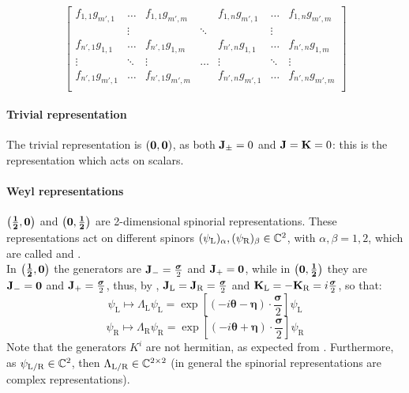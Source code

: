 {\begin{equation*}
\begin{bmatrix}
    f_{1,1} g_{m',1} & \dots & f_{1,1} g_{m',m} &  & f_{1,n} g_{m',1} & \dots & f_{1,n} g_{m',m} \\
     & \vdots &  & \ddots &  & \vdots &  \\
    f_{n',1} g_{1,1} & \dots & f_{n',1} g_{1,m} &  & f_{n',n} g_{1,1} & \dots & f_{n',n} g_{1,m} \\
    \vdots & \ddots & \vdots & \dots & \vdots & \ddots & \vdots \\
    f_{n',1} g_{m',1} & \dots & f_{n',1} g_{m',m} &  & f_{n',n} g_{m',1} & \dots & f_{n',n} g_{m',m} \\
  \end{bmatrix}
\end{equation*}}

\paragraph{Trivial representation}

The trivial representation is $ \mathbf{\left( 0,0 \right)} $, as both $ \mathbf{J}_{\pm} = 0 $ and $ \mathbf{J} = \mathbf{K} = 0 $: this is the representation which acts on scalars.

\paragraph{Weyl representations}

$ \mathbf{\left( \frac{1}{2},0 \right)} $ and $ \mathbf{\left( 0,\frac{1}{2} \right)} $ are 2-dimensional spinorial representations. These representations act on different spinors $ (\psi_\text{L})_\alpha , (\psi_\text{R})_\beta \in \mathbb{C}^2 $, with $ \alpha,\beta = 1,2 $, which are called  and .\\
In $ \mathbf{\left( \frac{1}{2},0 \right)} $ the generators are $ \mathbf{J}_- = \frac{\boldsymbol{\sigma}}{2} $ and $ \mathbf{J}_+ = \mathbf{0} $, while in $ \mathbf{\left( 0,\frac{1}{2} \right)} $ they are $ \mathbf{J}_- = \mathbf{0} $ and $ \mathbf{J}_+ = \frac{\boldsymbol{\sigma}}{2} $, thus, by , $ \mathbf{J}_\text{L} = \mathbf{J}_\text{R} = \frac{\boldsymbol{\sigma}}{2} $ and $ \mathbf{K}_\text{L} = - \mathbf{K}_\text{R} = i \frac{\boldsymbol{\sigma}}{2} $, so that:
\begin{equation}
  \psi_\text{L} \mapsto \Lambda_\text{L} \psi_\text{L} = \exp \left[ \left( -i \boldsymbol{\theta} - \boldsymbol{\eta} \right) \cdot \frac{\boldsymbol{\sigma}}{2} \right] \psi_\text{L}
  \label{eq:lor-left-hand-weyl}
\end{equation}
\begin{equation}
  \psi_\text{R} \mapsto \Lambda_\text{R} \psi_\text{R} = \exp \left[ \left( -i \boldsymbol{\theta} + \boldsymbol{\eta} \right) \cdot \frac{\boldsymbol{\sigma}}{2} \right] \psi_\text{R}
  \label{eq:lor-right-hand-weyl}
\end{equation}
Note that the generators $ K^i $ are not hermitian, as expected from . Furthermore, as $ \psi_{\text{L}/\text{R}} \in \mathbb{C}^2 $, then $ \Lambda_{\text{L}/\text{R}} \in \mathbb{C}^{2 \times 2} $ (in general the spinorial representations are complex representations).

